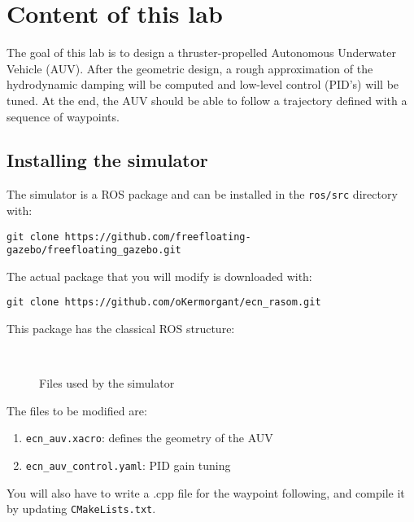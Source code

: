 \documentclass{ecnreport}
\begin{document}


\section{Content of this lab}

The goal of this lab is to design a thruster-propelled Autonomous Underwater Vehicle (AUV). After the geometric design, a rough approximation of the hydrodynamic damping will be computed
and low-level control (PID's) will be tuned. At the end, the AUV should be able to follow a trajectory defined with a sequence of waypoints.

\subsection{Installing the simulator}

The simulator is a ROS package and can be installed in the \texttt{ros/src} directory with:
\begin{center}
\begin{lstlisting}
git clone https://github.com/freefloating-gazebo/freefloating_gazebo.git
\end{lstlisting}
\end{center}

The actual package that you will modify is downloaded with:
\begin{center}
\begin{lstlisting}
git clone https://github.com/oKermorgant/ecn_rasom.git
\end{lstlisting}
\end{center}
This package has the classical ROS structure:
\begin{figure}[h]
\begin{minipage}{.25\linewidth} ~ \end{minipage}
\begin{minipage}{.5\linewidth}
\end{minipage}
\caption{Files used by the simulator}
\end{figure}

The files to be modified are:
\begin{enumerate}
 \item \texttt{ecn\_auv.xacro}: defines the geometry of the AUV
 \item \texttt{ecn\_auv\_control.yaml}: PID gain tuning
\end{enumerate}
You will also have to write a .cpp file for the waypoint following, and compile it by updating \texttt{CMakeLists.txt}.
\end{document}
